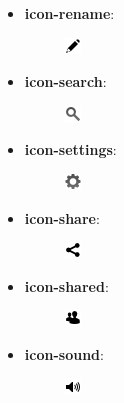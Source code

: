 \documentclass[letterpaper,10pt,english]{sphinxmanual}
\begin{document}
\begin{itemize}
\begin{description}
\end{description}

\item {} \begin{description}
\item[{\textbf{icon-rename}:}] \leavevmode
\includegraphics{rename.png}

\end{description}

\item {} \begin{description}
\item[{\textbf{icon-search}:}] \leavevmode
\includegraphics{search.png}

\end{description}

\item {} \begin{description}
\item[{\textbf{icon-settings}:}] \leavevmode
\includegraphics{settings.png}

\end{description}

\item {} \begin{description}
\item[{\textbf{icon-share}:}] \leavevmode
\includegraphics{share.png}

\end{description}

\item {} \begin{description}
\item[{\textbf{icon-shared}:}] \leavevmode
\includegraphics{shared.png}

\end{description}

\item {} \begin{description}
\item[{\textbf{icon-sound}:}] \leavevmode
\includegraphics{sound.png}


\end{description}
\end{itemize}
\end{document}
